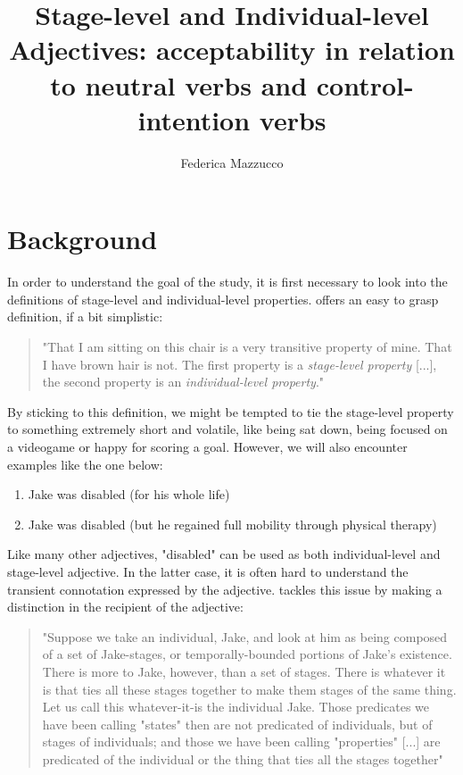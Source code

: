 \documentclass[12pt,a4paper]{article}
\author{Federica Mazzucco}
\title{Stage-level and Individual-level Adjectives: acceptability in relation to neutral verbs and control-intention verbs}
\begin{document}
\maketitle
\vspace{3.5cm}
\tableofcontents
\newpage
\section{Background}

In order to understand the goal of the study, it is first necessary to look into the definitions of stage-level and individual-level properties. \citeauthor{Kratzer1995} offers an easy to grasp definition, if a bit simplistic:

\begin{quote}
"That I am sitting on this chair is a very transitive property of mine. That I have brown hair is not. The first property is a \textit{stage-level property} [...], the second property is an \textit{individual-level property}."
 \parencite{Kratzer1995}
\end{quote}

By sticking to this definition, we might be tempted to tie the stage-level property to something extremely short and volatile, like being sat down, being focused on a videogame or happy for scoring a goal. However, we will also encounter examples like the one below:

\begin{enumerate}
\item Jake was disabled (for his whole life)
\item Jake was disabled (but he regained full mobility through physical therapy)
\end{enumerate}

Like many other adjectives, "disabled" can be used as both individual-level and stage-level adjective. In the latter case, it is often hard to understand the transient connotation expressed by the adjective. \citeauthor{Carlson1977} tackles this issue by making a distinction in the recipient of the adjective:


\begin{quote}
"Suppose we take an individual, Jake, and look at him as being composed of a set of Jake-stages, or temporally-bounded portions of Jake's existence. There is more to Jake, however, than a set of stages. There is whatever it is that ties all these stages together to make them stages of the same thing. Let us call this whatever-it-is the individual Jake. Those predicates we have been calling "states" then are not predicated of individuals, but of stages of individuals; and those we have been calling "properties" [...] are predicated of the individual  or the thing that ties all the stages together" \parencite{Carlson1977} 
\end{quote}
\end{document}
